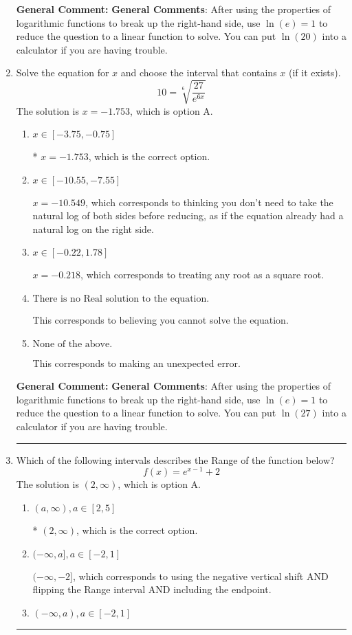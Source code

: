 \documentclass{extbook}[14pt]
\newcommand{\litem}[1]{\item #1

\rule{\textwidth}{0.4pt}}
\begin{document}
\begin{enumerate}
{\textbf{General Comment:} \textbf{General Comments}: After using the properties of logarithmic functions to break up the right-hand side, use $\ln(e) = 1$ to reduce the question to a linear function to solve. You can put $\ln(20)$ into a calculator if you are having trouble.
}
\litem{
 Solve the equation for $x$ and choose the interval that contains $x$ (if it exists).
\[  10 = \sqrt[6]{\frac{27}{e^{6x}}} \]The solution is \( x = -1.753 \), which is option A.\begin{enumerate}[label=\Alph*.]
\item \( x \in [-3.75, -0.75] \)

* $x = -1.753$, which is the correct option.
\item \( x \in [-10.55, -7.55] \)

$x = -10.549$, which corresponds to thinking you don't need to take the natural log of both sides before reducing, as if the equation already had a natural log on the right side.
\item \( x \in [-0.22, 1.78] \)

$x = -0.218$, which corresponds to treating any root as a square root.
\item \( \text{There is no Real solution to the equation.} \)

This corresponds to believing you cannot solve the equation.
\item \( \text{None of the above.} \)

This corresponds to making an unexpected error.
\end{enumerate}

\textbf{General Comment:} \textbf{General Comments}: After using the properties of logarithmic functions to break up the right-hand side, use $\ln(e) = 1$ to reduce the question to a linear function to solve. You can put $\ln(27)$ into a calculator if you are having trouble.
}
\litem{
Which of the following intervals describes the Range of the function below?
\[ f(x) = e^{x-1}+2 \]The solution is \( (2, \infty) \), which is option A.\begin{enumerate}[label=\Alph*.]
\item \( (a, \infty), a \in [2, 5] \)

* $(2, \infty)$, which is the correct option.
\item \( (-\infty, a], a \in [-2, 1] \)

$(-\infty, -2]$, which corresponds to using the negative vertical shift AND flipping the Range interval AND including the endpoint.
\item \( (-\infty, a), a \in [-2, 1] \)


\end{enumerate}}
\end{enumerate}
\end{document}
